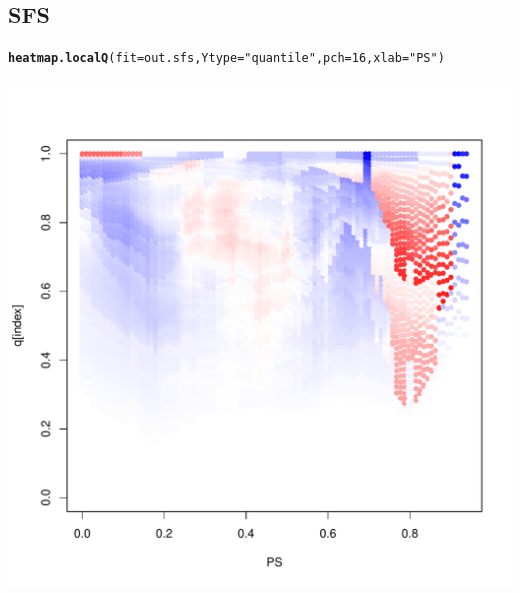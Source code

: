 \documentclass{article}\usepackage[]{graphicx}\usepackage[]{color}
\makeatletter
\def\maxwidth{ %
  \ifdim\Gin@nat@width>\linewidth
    \linewidth
  \else
    \Gin@nat@width
  \fi
}
\newcommand{\hlnum}[1]{\textcolor[rgb]{0.686,0.059,0.569}{#1}}%
\newcommand{\hlstr}[1]{\textcolor[rgb]{0.192,0.494,0.8}{#1}}%
\newcommand{\hlstd}[1]{\textcolor[rgb]{0.345,0.345,0.345}{#1}}%
\newcommand{\hlkwc}[1]{\textcolor[rgb]{0.333,0.667,0.333}{#1}}%
\newcommand{\hlkwd}[1]{\textcolor[rgb]{0.737,0.353,0.396}{\textbf{#1}}}%
\newenvironment{kframe}{%
 \def\at@end@of@kframe{}%
 \ifinner\ifhmode%
  \def\at@end@of@kframe{\end{minipage}}%
  \begin{minipage}{\columnwidth}%
 \fi\fi%
 \def\FrameCommand##1{\hskip\@totalleftmargin \hskip-\fboxsep
 \colorbox{shadecolor}{##1}\hskip-\fboxsep
     \hskip-\linewidth \hskip-\@totalleftmargin \hskip\columnwidth}%
 \MakeFramed {\advance\hsize-\width
   \@totalleftmargin\z@ \linewidth\hsize
   \@setminipage}}%
 {\par\unskip\endMakeFramed%
 \at@end@of@kframe}
\newenvironment{knitrout}{}{} %
\makeatother
\begin{document}
\subsection{SFS}
\begin{knitrout}
\color{fgcolor}\begin{kframe}
\begin{alltt}
\hlkwd{heatmap.localQ}\hlstd{(}\hlkwc{fit}\hlstd{=out.sfs ,} \hlkwc{Ytype}\hlstd{=}\hlstr{"quantile"} \hlstd{,} \hlkwc{pch}\hlstd{=}\hlnum{16} \hlstd{,} \hlkwc{xlab}\hlstd{=}\hlstr{"PS"}\hlstd{)}
\end{alltt}
\end{kframe}

{\centering \includegraphics[width=\maxwidth]{figures/SFS-heatmap-1} 

}



\end{knitrout}
\end{document}
